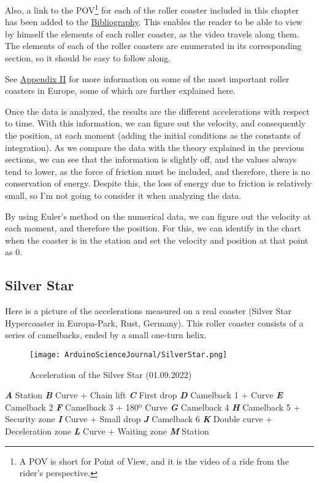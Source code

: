 \documentclass[12pt,twoside,a4paper]{article}
\renewcommand{\quote}[1]{\og#1\fg{}}
\begin{document}
	Also, a link to the POV\footnote{A POV is short for \quote{Point of View}, and it is the video of a ride from the rider's perspective.} for each of the roller coaster included in this chapter has been added to the \hyperref[sec:Bibliography]{Bibliography}. This enables the reader to be able to view by himself the elements of each roller coaster, as the video travels along them. The elements of each of the roller coasters are enumerated in its corresponding section, so it should be easy to follow along.
	
	See \hyperref[sec:Appendix II]{Appendix II} for more information on some of the most important roller coasters in Europe, some of which are further explained here.
	
	Once the data is analyzed, the results are the different accelerations with respect to time. With this information, we can figure out the velocity, and consequently the position, at each moment (adding the initial conditions as the constants of integration). As we compare the data with the theory explained in the previous sections, we can see that the information is slightly off, and the values always tend to lower, as the force of friction must be included, and therefore, there is no conservation of energy. Despite this, the loss of energy due to friction is relatively small, so I'm not going to consider it when analyzing the data.
	
	By using Euler's method on the numerical data, we can figure out the velocity at each moment, and therefore the position. For this, we can identify in the chart when the coaster is in the station and set the velocity and position at that point as 0.

	\newpage
	
	\subsection{Silver Star}
	Here is a picture of the accelerations measured on a real coaster (Silver Star Hypercoaster in Europa-Park, Rust, Germany). This roller coaster consists of a series of camelbacks, ended by a small one-turn helix.
	
	\begin{figure}[H]
		\centering
		\texttt{[image: ArduinoScienceJournal/SilverStar.png]}
		\caption{Acceleration of the Silver Star (01.09.2022)}
		\label{fig:Silver star acceleration}
	\end{figure}

	{\small\textbf{\textit{A}} Station \textbf{\textit{B}} Curve + Chain lift \textbf{\textit{C}} First drop \textbf{\textit{D}} Camelback 1 + Curve \textbf{\textit{E}} Camelback 2 \textbf{\textit{F}} Camelback 3 + 180º Curve \textbf{\textit{G}} Camelback 4 \textbf{\textit{H}} Camelback 5 + Security zone \textbf{\textit{I}} Curve + Small drop \textbf{\textit{J}} Camelback 6 \textbf{\textit{K}} Double curve + Deceleration zone \textbf{\textit{L}} Curve + Waiting zone \textbf{\textit{M}} Station}
	
\end{document}
